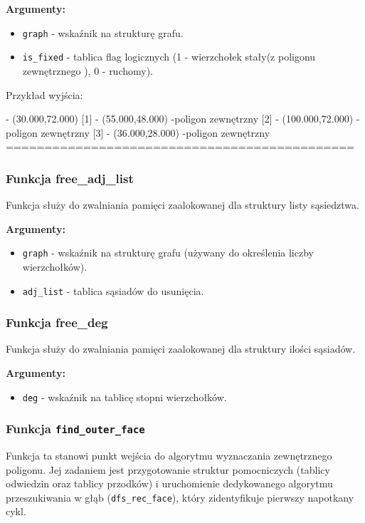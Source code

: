 \documentclass[]{article}
\begin{document}
\textbf{Argumenty:}
\begin{itemize}
\item \texttt{graph} - wskaźnik na strukturę grafu.
\item \texttt{is\_fixed} - tablica flag logicznych (1 - wierzchołek stały(z poligonu zewnętrznego ), 0 - ruchomy).
\end{itemize}
Przykład wyjścia:
\begin{mylisting}
[0] - (30.000,72.000) 
[1] - (55.000,48.000) -poligon zewnętrzny
[2] - (100.000,72.000) -poligon zewnętrzny
[3] - (36.000,28.000) -poligon zewnętrzny
=============================================
\end{mylisting}

\subsubsection{Funkcja free\_adj\_list}
Funkcja służy do zwalniania pamięci zaalokowanej dla struktury listy sąsiedztwa.

\textbf{Argumenty:}
\begin{itemize}
\item \texttt{graph} - wskaźnik na strukturę grafu (używany do określenia liczby wierzchołków).
\item \texttt{adj\_list} - tablica sąsiadów do usunięcia.
\end{itemize}
\subsubsection{Funkcja free\_deg}
Funkcja służy do zwalniania pamięci zaalokowanej dla struktury ilości sąsiadów.

\textbf{Argumenty:}
\begin{itemize}
\item \texttt{deg} - wskaźnik na tablicę stopni wierzchołków.
\end{itemize}


\subsubsection{Funkcja \texttt{find\_outer\_face}}

Funkcja ta stanowi punkt wejścia do algorytmu wyznaczania zewnętrznego poligonu. Jej zadaniem jest przygotowanie struktur pomocniczych (tablicy odwiedzin oraz tablicy przodków) i uruchomienie dedykowanego algorytmu przeszukiwania w głąb (\texttt{dfs\_rec\_face}), który zidentyfikuje pierwszy napotkany cykl.
\end{document}
